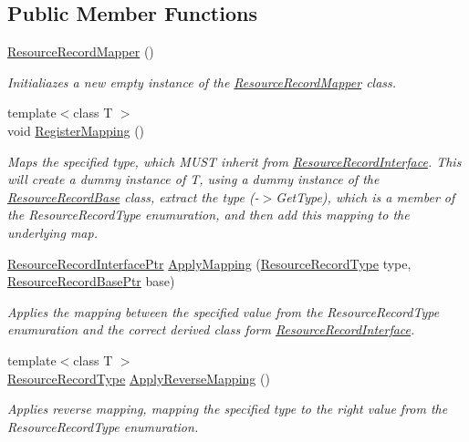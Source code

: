 \subsection*{Public Member Functions}
\begin{DoxyCompactItemize}
\item 
\hyperlink{class_senergy_1_1_dns_1_1_resource_record_mapper_a2442004b11c8561651561074f12cc3c9}{Resource\-Record\-Mapper} ()
\begin{DoxyCompactList}\small\item\em Initialiazes a new empty instance of the \hyperlink{class_senergy_1_1_dns_1_1_resource_record_mapper}{Resource\-Record\-Mapper} class. \end{DoxyCompactList}\item 
{\footnotesize template$<$class T $>$ }\\void \hyperlink{class_senergy_1_1_dns_1_1_resource_record_mapper_ace6af26f447a87243388f5527abf870c}{Register\-Mapping} ()
\begin{DoxyCompactList}\small\item\em Maps the specified type, which M\-U\-S\-T inherit from \hyperlink{class_senergy_1_1_dns_1_1_resource_record_interface}{Resource\-Record\-Interface}. This will create a dummy instance of T, using a dummy instance of the \hyperlink{class_senergy_1_1_dns_1_1_resource_record_base}{Resource\-Record\-Base} class, extract the type (-\/$>$Get\-Type), which is a member of the Resource\-Record\-Type enumuration, and then add this mapping to the underlying map. \end{DoxyCompactList}\item 
\hyperlink{namespace_senergy_1_1_dns_a425b37e088cb64a1bda6205581ade5c8}{Resource\-Record\-Interface\-Ptr} \hyperlink{class_senergy_1_1_dns_1_1_resource_record_mapper_ad9335f22e9d4a069ae38e65d1565f509}{Apply\-Mapping} (\hyperlink{namespace_senergy_1_1_dns_a590bfd748c955364770f5ce358d9dfe0}{Resource\-Record\-Type} type, \hyperlink{namespace_senergy_1_1_dns_a72915c893fbf242018e79d8f92e1646b}{Resource\-Record\-Base\-Ptr} base)
\begin{DoxyCompactList}\small\item\em Applies the mapping between the specified value from the Resource\-Record\-Type enumuration and the correct derived class form \hyperlink{class_senergy_1_1_dns_1_1_resource_record_interface}{Resource\-Record\-Interface}. \end{DoxyCompactList}\item 
{\footnotesize template$<$class T $>$ }\\\hyperlink{namespace_senergy_1_1_dns_a590bfd748c955364770f5ce358d9dfe0}{Resource\-Record\-Type} \hyperlink{class_senergy_1_1_dns_1_1_resource_record_mapper_a4a12162b6962aa857c2075ab17ef4375}{Apply\-Reverse\-Mapping} ()
\begin{DoxyCompactList}\small\item\em Applies reverse mapping, mapping the specified type to the right value from the Resource\-Record\-Type enumuration. \end{DoxyCompactList}\end{DoxyCompactItemize}


